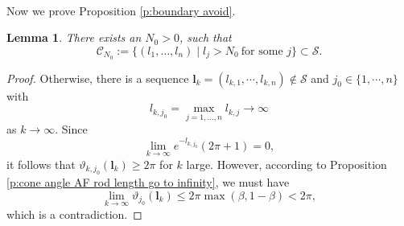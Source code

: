 \documentclass[a4paper,11pt]{amsart}
\newtheorem{lemma}[theorem]{Lemma}
\theoremstyle{definition}
\numberwithin{equation}{section}
\newcommand{\bl}{\bm{l}}
\begin{document}
\

Now we prove Proposition \ref{p:boundary avoid}.


\begin{lemma}\label{lem:AF example interpolatable 1}
    There exists an $N_0>0$, such that 
    $$\mathcal{C}_{N_0}:=\{(l_1,\ldots,l_n)\mid l_j>N_0 \ \text{for some $j$}\}\subset \mathcal S.$$ 

\end{lemma}
\begin{proof}
    Otherwise, there is a sequence $\bl_k=(l_{k, 1}, \cdots, l_{k, n})\notin \mathcal S$ and $j_0\in \{1, \cdots, n\}$ with $$l_{k, j_0}=\max_{j=1,\ldots,n}l_{k,j}\to\infty$$ as $k\rightarrow\infty$. Since $$\lim_{k\rightarrow\infty}e^{-l_{k, j_0}}(2\pi+1)= 0,$$ it follows that
    $\vartheta_{k, j_0}(\bl_k)\geq2\pi$ for $k$ large. However, according to Proposition \ref{p:cone angle AF rod length go to infinity},  we must have $$\lim_{k\rightarrow\infty}\vartheta_{j_0}(\bl_k)\leq 2\pi\max(\beta, 1-\beta)<2\pi,$$which is a contradiction.
\end{proof}
\end{document}
